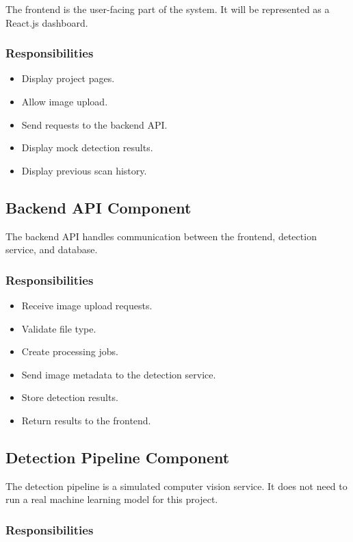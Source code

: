 \documentclass[12pt]{article}
\begin{document}
The frontend is the user-facing part of the system. It will be represented as a React.js dashboard.

\subsubsection{Responsibilities}

\begin{itemize}
    \item Display project pages.
    \item Allow image upload.
    \item Send requests to the backend API.
    \item Display mock detection results.
    \item Display previous scan history.
\end{itemize}

\subsection{Backend API Component}

The backend API handles communication between the frontend, detection service, and database.

\subsubsection{Responsibilities}

\begin{itemize}
    \item Receive image upload requests.
    \item Validate file type.
    \item Create processing jobs.
    \item Send image metadata to the detection service.
    \item Store detection results.
    \item Return results to the frontend.
\end{itemize}

\subsection{Detection Pipeline Component}

The detection pipeline is a simulated computer vision service. It does not need to run a real machine learning model for this project.

\subsubsection{Responsibilities}
\end{document}
